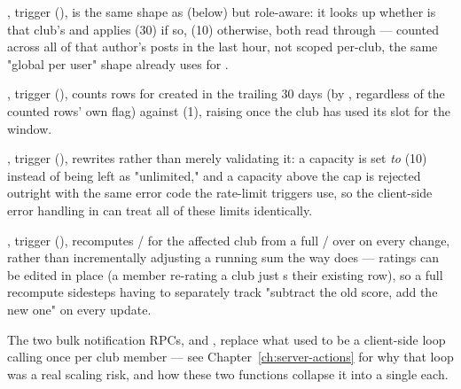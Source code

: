 , trigger  (), is the same shape as  (below) but role-aware: it looks up whether  is that club's  and applies  (30) if so,  (10) otherwise, both read through  — counted across all of that author's posts in the last hour, not scoped per-club, the same "global per user" shape  already uses for .

, trigger  (), counts  rows for  created in the trailing 30 days (by , regardless of the counted rows' own  flag) against  (1), raising  once the club has used its slot for the window.

, trigger  (), rewrites  rather than merely validating it: a  capacity is set \emph{to}  (10) instead of being left as "unlimited," and a capacity above the cap is rejected outright with the same  error code the rate-limit triggers use, so the client-side error handling in  can treat all of these limits identically.

, trigger  (), recomputes / for the affected club from a full / over  on every change, rather than incrementally adjusting a running sum the way  does — ratings can be edited in place (a member re-rating a club just s their existing row), so a full recompute sidesteps having to separately track "subtract the old score, add the new one" on every update.

\begin{olknote}
The two bulk notification RPCs,  and , replace what used to be a client-side loop calling  once per club member — see Chapter~\ref{ch:server-actions} for why that loop was a real scaling risk, and how these two  functions collapse it into a single  each.
\end{olknote}

